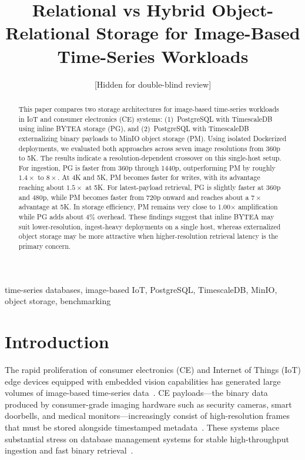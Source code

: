 \documentclass[conference]{IEEEtran}
\begin{document}
\title{Relational vs Hybrid Object-Relational Storage for Image-Based Time-Series Workloads}

\author{
[Hidden for double-blind review]
}


\maketitle

\begin{abstract}
This paper compares two storage architectures for image-based time-series workloads in IoT and consumer electronics (CE) systems: (1)~PostgreSQL with TimescaleDB using inline BYTEA storage (PG), and (2)~PostgreSQL with TimescaleDB externalizing binary payloads to MinIO object storage (PM). Using isolated Dockerized deployments, we evaluated both approaches across seven image resolutions from 360p to 5K. The results indicate a resolution-dependent crossover on this single-host setup. For ingestion, PG is faster from 360p through 1440p, outperforming PM by roughly $1.4\times$ to $8\times$. At 4K and 5K, PM becomes faster for writes, with its advantage reaching about $1.5\times$ at 5K. For latest-payload retrieval, PG is slightly faster at 360p and 480p, while PM becomes faster from 720p onward and reaches about a $7\times$ advantage at 5K. In storage efficiency, PM remains very close to 1.00$\times$ amplification while PG adds about 4\% overhead. These findings suggest that inline BYTEA may suit lower-resolution, ingest-heavy deployments on a single host, whereas externalized object storage may be more attractive when higher-resolution retrieval latency is the primary concern.
\end{abstract}

\begin{IEEEkeywords}
time-series databases, image-based IoT, PostgreSQL, TimescaleDB, MinIO, object storage, benchmarking
\end{IEEEkeywords}

\section{Introduction}
\label{sec:introduction}

The rapid proliferation of consumer electronics (CE) and Internet of Things (IoT) edge devices equipped with embedded vision capabilities has generated large volumes of image-based time-series data~\cite{ieee_ce_definition}. CE payloads---the binary data produced by consumer-grade imaging hardware such as security cameras, smart doorbells, and medical monitors---increasingly consist of high-resolution frames that must be stored alongside timestamped metadata~\cite{intuz_iot_databases,ceec_tsdb_review}. These systems place substantial stress on database management systems for stable high-throughput ingestion and fast binary retrieval~\cite{jensen_tsms_survey,nerc_tsdb_survey}.
\end{document}
